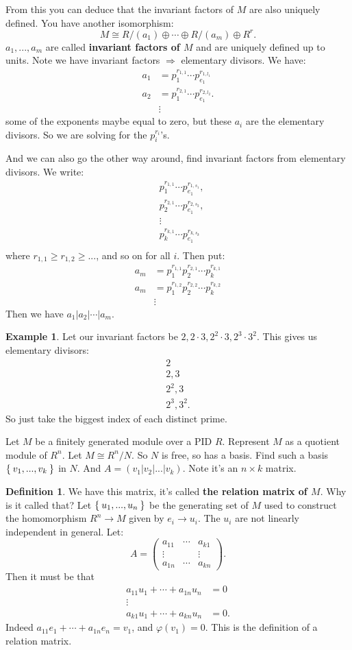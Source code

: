\documentclass[12pt]{amsbook}
\theoremstyle{plain}
\numberwithin{section}{chapter}
\numberwithin{equation}{chapter}
\theoremstyle{definition}
\newtheorem{Def}[theorem]{Definition}
\newtheorem{Ex}[theorem]{Example}
\theoremstyle{remark}
\newcommand{\bee}{\begin{equation}\begin{aligned}}
\newcommand{\eee}{\end{aligned}\end{equation}}
\newcommand{\lpar}{\left(}
\newcommand{\rpar}{\right)}
\renewcommand{\geq}{\geqslant}
\renewcommand{\phi}{\varphi}
\begin{document}
From this you can deduce that the invariant factors of $M$ are also uniquely defined. You have another isomorphism:
$$
M \cong R/(a_1) \oplus \cdots \oplus R/(a_m) \oplus R^r.
$$
$a_1,...,a_m$ are called \textbf{invariant factors of $M$} and are uniquely defined up to units. Note we have invariant factors $\Rightarrow$ elementary divisors. We have:
\bee
a_1  &=p_1^{r_{1,1}}\cdots p_{e_1}^{r_{1,l_1}}\\
a_2  &=p_1^{r_{2,1}}\cdots p_{e_1}^{r_{2,l_2}}.\\
&\vdots
\eee
some of the exponents maybe equal to zero, but these $a_i$ are the elementary divisors. So we are solving for the $p_i^{r_i}$'s. 

And we can also go the other way around, find invariant factors from elementary divisors. We write:
\bee
&p_1^{r_{1,1}}\cdots p_{e_1}^{r_{1,s_1}},\\
&p_2^{r_{2,1}}\cdots p_{e_1}^{r_{2,s_2}},\\
&\vdots\\
&p_k^{r_{k,1}}\cdots p_{e_1}^{r_{k,s_k}}\\
\eee
where $r_{1,1} \geq r_{1,2} \geq ...$, and so on for all $i$. Then put:
\bee
a_m &= p_1^{r_{1,1}}p_2^{r_{2,1}}\cdots p_k^{r_{k,1}}\\
a_m &= p_1^{r_{1,2}}p_2^{r_{2,2}}\cdots p_k^{r_{k,2}}\\
&\vdots
\eee
Then we have $a_1|a_2|\cdots|a_m$. 

\begin{Ex}
Let our invariant factors be $2,2\cdot 3,2^2\cdot 3,2^3\cdot 3^2$. This gives us elementary divisors:
\bee
2\\
2,3\\
2^2,3\\
2^3,3^2.
\eee
So just take the biggest index of each distinct prime. 
\end{Ex}

Let $M$ be a finitely generated module over a PID $R$. Represent $M$ as a quotient module of $R^n$. Let $M \cong R^n/N$. So $N$ is free, so has a basis. Find such a basis $\Set{v_1,...,v_k}$ in $N$. And $A = (v_1|v_2|...|v_k)$. Note it's an $n \times k$ matrix. 
\begin{Def}
We have this matrix, it's called \textbf{the relation matrix of $M$}. 
Why is it called that? Let $\Set{u_1,...,u_n}$ be the generating set of $M$ used to construct the homomorphism $R^n \to M$ given by $e_i \to u_i$. The $u_i$ are not linearly independent in general. Let:
$$
A = \lpar 
\begin{matrix}
a_{11} & \cdots & a_{k1}\\
\vdots & & \vdots\\
a_{1n} & \cdots & a_{kn}
\end{matrix} \rpar. 
$$
Then it must be that 
\bee
a_{11}u_1 + \cdots + a_{1n}u_n &= 0\\
\vdots \\
a_{k1}u_1 + \cdots + a_{kn}u_n &= 0.
\eee
Indeed $a_{11}e_1 + \cdots + a_{1n}e_n  =v_1$, and $\phi(v_1)  =0$. This is the definition of a relation matrix. 
\end{Def}
\end{document}
